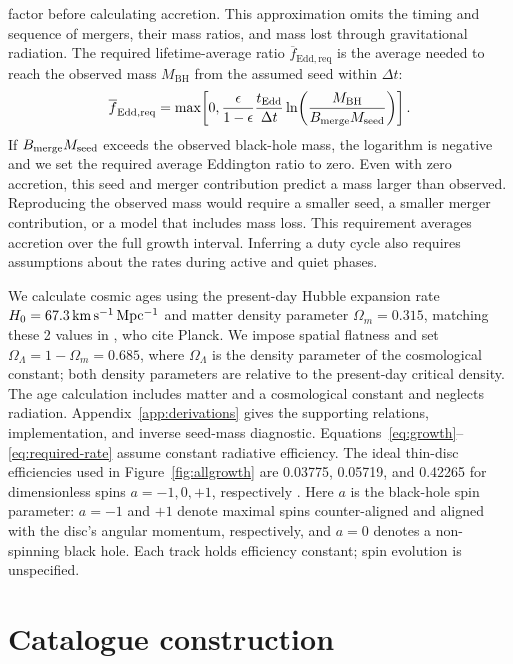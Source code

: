 \documentclass[11pt]{article}
\newcommand{\mbh}{M_{\mathrm{BH}}}
\newcommand{\mseed}{M_{\mathrm{seed}}}
\begin{document}
factor before calculating accretion. This approximation omits the timing and
sequence of mergers, their mass ratios, and mass lost through gravitational radiation.
The required lifetime-average ratio $\overline{f}_{\mathrm{Edd,req}}$ is the
average needed to reach the observed mass $\mbh$ from the assumed seed
within $\Delta t$:
\begin{equation}
\overline{f}_{\mathrm{Edd,req}}
=\max\!\left[0,\frac{\epsilon}{1-\epsilon}
\frac{t_{\rm Edd}}{\Delta t}
\ln\!\left(\frac{\mbh}{B_{\rm merge}\mseed}\right)\right].
\label{eq:required-rate}
\end{equation}
If $B_{\rm merge}M_{\rm seed}$ exceeds the observed black-hole mass, the
logarithm is negative and we set the required average Eddington ratio to zero.
Even with zero accretion, this seed and merger contribution predict a mass
larger than observed. Reproducing the observed mass would require a smaller
seed, a smaller merger contribution, or a model that includes mass loss.
This requirement averages accretion over the full growth interval. Inferring
a duty cycle also requires assumptions about the rates during active and quiet phases.

We calculate cosmic ages using the present-day Hubble expansion rate
$H_0=67.3\,{\rm km\,s^{-1}\,Mpc^{-1}}$ and matter density parameter
$\Omega_m=0.315$, matching these 2 values in \citet{dayal2024},
who cite Planck. We impose spatial flatness and set
$\Omega_\Lambda=1-\Omega_m=0.685$, where $\Omega_\Lambda$ is the density
parameter of the cosmological constant; both density parameters are relative
to the present-day critical density. The age calculation includes matter
and a cosmological constant and neglects radiation. Appendix~\ref{app:derivations}
gives the supporting relations, implementation, and inverse seed-mass diagnostic.
Equations~\ref{eq:growth}--\ref{eq:required-rate} assume constant radiative efficiency.
The ideal thin-disc efficiencies used in Figure~\ref{fig:allgrowth} are
0.03775, 0.05719, and 0.42265 for dimensionless spins $a=-1,0,+1$,
respectively \citep{bardeen1972}. Here $a$ is the black-hole spin parameter:
$a=-1$ and $+1$ denote maximal spins counter-aligned and aligned with the
disc's angular momentum, respectively, and $a=0$ denotes a non-spinning
black hole. Each track holds efficiency constant;
spin evolution is unspecified.

\section{Catalogue construction}
\end{document}
